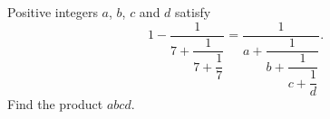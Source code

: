 Positive integers $a$, $b$, $c$ and $d$ satisfy
\[1-\dfrac{1}{7+\dfrac{1}{7+\dfrac{1}{7}}}=\dfrac{1}{a+\dfrac{1}{b+\dfrac{1}{c+\dfrac{1}{d}}}}.\]
Find the product $abcd$.
